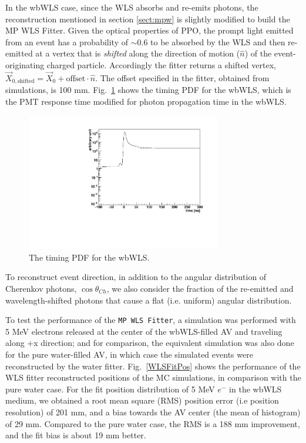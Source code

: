 In the wbWLS case, since the WLS absorbs and re-emits photons, the reconstruction mentioned in section \ref{sect:mpw} is slightly modified to build the MP WLS Fitter. Given the optical properties of PPO, the prompt light emitted from an event has a probability of $\sim$0.6 to be absorbed by the WLS and then re-emitted at a vertex that is {\em shifted} along the direction of motion ($\hat{n}$) of the event-originating charged particle. Accordingly the fitter returns a shifted vertex, $\vec{X}_\mathrm{0,shifted}=\vec{X}_0+\mathrm{offset}\cdot\hat{n}$. The offset specified in the fitter, obtained from simulations, is 100 mm. Fig.~\ref{WLS_pdf} shows the timing PDF for the wbWLS, which is the PMT response time modified for photon propagation time in the wbWLS.

\begin{figure}[htbp]	
	\centering		
	\begin{minipage}[b]{0.5\textwidth}			
		\includegraphics[height=6cm]{WLSTime_pdf.pdf}			
	\end{minipage}%
	\caption{\label{WLS_pdf} The timing PDF for the wbWLS.}	
\end{figure}

To reconstruct event direction, in addition to the angular distribution of Cherenkov photons, $\cos\theta_{Ch}$, we also consider the fraction of the re-emitted and wavelength-shifted photons that cause a flat (i.e. uniform) angular distribution.

To test the performance of the \texttt{MP WLS Fitter}, a simulation was performed with 5 MeV electrons released at the center of the wbWLS-filled AV and traveling along +x direction; and for comparison, the equivalent simulation was also done for the pure water-filled AV, in which case the simulated events were reconstructed by the water fitter. Fig.~\ref{WLSFitPos} shows the performance of the WLS fitter reconstructed positions of the MC simulations, in comparison with the pure water case. For the fit position distribution of 5 MeV $e^-$ in the wbWLS medium, we obtained a root mean square (RMS) position error (i.e position resolution) of 201 mm, and a bias towards the AV center (the mean of histogram) of 29 mm. Compared to the pure water case, the RMS is a 188 mm improvement, and the fit bias is about 19 mm better.

